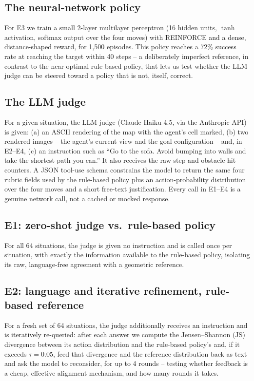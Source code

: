 \documentclass[10pt,twocolumn]{article}
\begin{document}
\subsection{The neural-network policy}
\label{subsec:nn}

For E3 we train a small 2-layer multilayer perceptron (16 hidden units,
$\tanh$ activation, softmax output over the four moves) with REINFORCE
and a dense, distance-shaped reward, for 1{,}500 episodes. This policy
reaches a 72\% success rate at reaching the target within 40 steps -- a
deliberately imperfect reference, in contrast to the near-optimal
rule-based policy, that lets us test whether the LLM judge can be
steered toward a policy that is not, itself, correct.

\subsection{The LLM judge}
\label{subsec:judge}

For a given situation, the LLM judge (Claude Haiku 4.5, via the
Anthropic API) is given: (a) an ASCII rendering of the map with the
agent's cell marked, (b) two rendered images -- the agent's current view
and the goal configuration -- and, in E2--E4, (c) an instruction such as
``Go to the sofa. Avoid bumping into walls and take the shortest path
you can.'' It also receives the raw step and obstacle-hit counters. A
JSON tool-use schema constrains the model to return the same four
rubric fields used by the rule-based policy plus an action-probability
distribution over the four moves and a short free-text justification.
Every call in E1--E4 is a genuine network call, not a cached or mocked
response.

\subsection{E1: zero-shot judge vs.\ rule-based policy}
For all 64 situations, the judge is given no instruction and is called
once per situation, with exactly the information available to the
rule-based policy, isolating its raw, language-free agreement with a
geometric reference.

\subsection{E2: language and iterative refinement, rule-based reference}
For a fresh set of 64 situations, the judge additionally receives an
instruction and is iteratively re-queried: after each answer we compute
the Jensen--Shannon (JS) divergence between its action distribution and
the rule-based policy's and, if it exceeds $\tau=0.05$, feed that
divergence and the reference distribution back as text and ask the model
to reconsider, for up to 4 rounds -- testing whether feedback is a cheap,
effective alignment mechanism, and how many rounds it takes.
\end{document}
